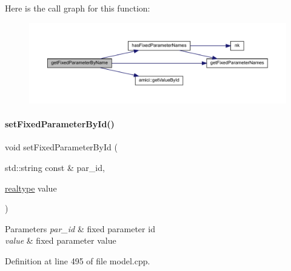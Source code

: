 Here is the call graph for this function\+:
\nopagebreak
\begin{figure}[H]
\begin{center}
\leavevmode
\includegraphics[width=350pt]{classamici_1_1_model_a99cc00a08b2f2d87d3eac047d00a7c57_cgraph}
\end{center}
\end{figure}
\mbox{\label{classamici_1_1_model_adc0d24343c6fed2e797fb402f7c2d256}} 
\paragraph{\texorpdfstring{set\+Fixed\+Parameter\+By\+Id()}{setFixedParameterById()}}
{\footnotesize\ttfamily void set\+Fixed\+Parameter\+By\+Id (\begin{DoxyParamCaption}\item[{std\+::string const \&}]{par\+\_\+id,  }\item[{\mbox{\hyperlink{namespaceamici_a1bdce28051d6a53868f7ccbf5f2c14a3}{realtype}}}]{value }\end{DoxyParamCaption})}


\begin{DoxyParams}{Parameters}
{\em par\+\_\+id} & fixed parameter id \\
\hline
{\em value} & fixed parameter value \\
\hline
\end{DoxyParams}


Definition at line 495 of file model.\+cpp.

